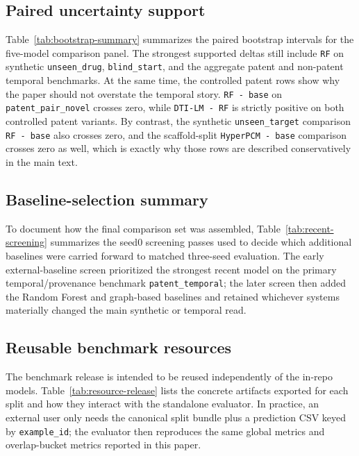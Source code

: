 \subsection{Paired uncertainty support}

Table~\ref{tab:bootstrap-summary} summarizes the paired bootstrap intervals for the five-model comparison panel. The strongest supported deltas still include \texttt{RF} on synthetic \texttt{unseen\_drug}, \texttt{blind\_start}, and the aggregate patent and non-patent temporal benchmarks. At the same time, the controlled patent rows show why the paper should not overstate the temporal story. \texttt{RF - base} on \texttt{patent\_pair\_novel} crosses zero, while \texttt{DTI-LM - RF} is strictly positive on both controlled patent variants. By contrast, the synthetic \texttt{unseen\_target} comparison \texttt{RF - base} also crosses zero, and the scaffold-split \texttt{HyperPCM - base} comparison crosses zero as well, which is exactly why those rows are described conservatively in the main text.



\subsection{Baseline-selection summary}

To document how the final comparison set was assembled, Table~\ref{tab:recent-screening} summarizes the seed0 screening passes used to decide which additional baselines were carried forward to matched three-seed evaluation. The early external-baseline screen prioritized the strongest recent model on the primary temporal/provenance benchmark \texttt{patent\_temporal}; the later screen then added the Random Forest and graph-based baselines and retained whichever systems materially changed the main synthetic or temporal read.



\subsection{Reusable benchmark resources}

The benchmark release is intended to be reused independently of the in-repo models. Table~\ref{tab:resource-release} lists the concrete artifacts exported for each split and how they interact with the standalone evaluator. In practice, an external user only needs the canonical split bundle plus a prediction CSV keyed by \texttt{example\_id}; the evaluator then reproduces the same global metrics and overlap-bucket metrics reported in this paper.

